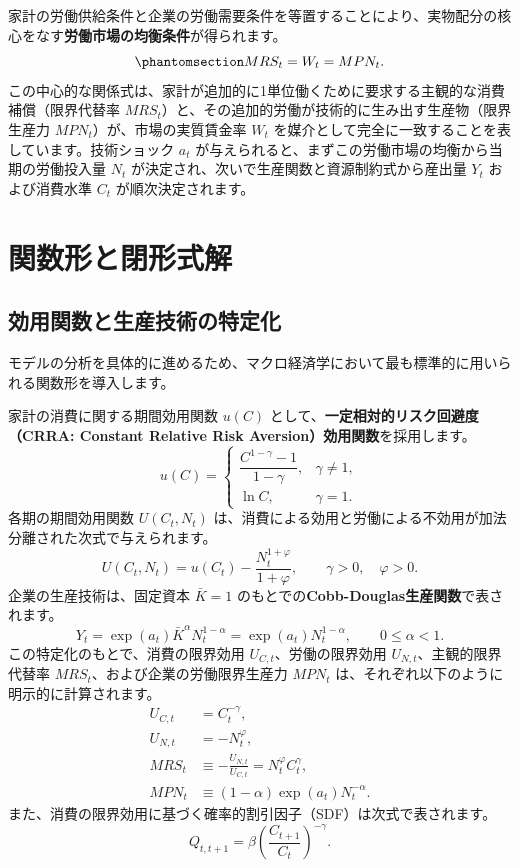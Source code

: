 \documentclass[
  japanese,
  lualatex,
  ja=standard,
  12pt,
  a4paper]{ltjsarticle}
\begin{document}
家計の労働供給条件と企業の労働需要条件を等置することにより、実物配分の核心をなす\textbf{労働市場の均衡条件}が得られます。
\begin{equation}\protect\phantomsection\label{eq-labor-market}{
MRS_t = W_t = MPN_t.
}\end{equation}
この中心的な関係式は、家計が追加的に1単位働くために要求する主観的な消費補償（限界代替率
\(MRS_t\)）と、その追加的労働が技術的に生み出す生産物（限界生産力
\(MPN_t\)）が、市場の実質賃金率 \(W_t\)
を媒介として完全に一致することを表しています。技術ショック \(a_t\)
が与えられると、まずこの労働市場の均衡から当期の労働投入量 \(N_t\)
が決定され、次いで生産関数と資源制約式から産出量 \(Y_t\) および消費水準
\(C_t\) が順次決定されます。

\section{関数形と閉形式解}\label{ux95a2ux6570ux5f62ux3068ux9589ux5f62ux5f0fux89e3}

\subsection{効用関数と生産技術の特定化}\label{ux52b9ux7528ux95a2ux6570ux3068ux751fux7523ux6280ux8853ux306eux7279ux5b9aux5316}

モデルの分析を具体的に進めるため、マクロ経済学において最も標準的に用いられる関数形を導入します。

家計の消費に関する期間効用関数 \(u(C)\)
として、\textbf{一定相対的リスク回避度（CRRA: Constant Relative Risk
Aversion）効用関数}を採用します。 \[
u(C) =
\begin{cases}
\dfrac{C^{1-\gamma}-1}{1-\gamma}, & \gamma \neq 1,\\[8pt]
\ln C, & \gamma = 1.
\end{cases}
\] 各期の期間効用関数 \(U(C_t, N_t)\)
は、消費による効用と労働による不効用が加法分離された次式で与えられます。
\[
U(C_t, N_t) = u(C_t) - \frac{N_t^{1+\varphi}}{1+\varphi}, \qquad \gamma > 0, \quad \varphi > 0.
\] 企業の生産技術は、固定資本 \(\bar{K}=1\)
のもとでの\textbf{Cobb-Douglas生産関数}で表されます。 \[
Y_t = \exp(a_t) \bar{K}^\alpha N_t^{1-\alpha} = \exp(a_t) N_t^{1-\alpha}, \qquad 0 \leq \alpha < 1.
\] この特定化のもとで、消費の限界効用 \(U_{C,t}\)、労働の限界効用
\(U_{N,t}\)、主観的限界代替率 \(MRS_t\)、および企業の労働限界生産力
\(MPN_t\) は、それぞれ以下のように明示的に計算されます。 \[
\begin{aligned}
U_{C,t} &= C_t^{-\gamma},\\
U_{N,t} &= -N_t^\varphi,\\
MRS_t &\equiv -\frac{U_{N,t}}{U_{C,t}} = N_t^\varphi C_t^\gamma,\\
MPN_t &\equiv (1-\alpha) \exp(a_t) N_t^{-\alpha}.
\end{aligned}
\] また、消費の限界効用に基づく確率的割引因子（SDF）は次式で表されます。
\[
Q_{t,t+1} = \beta \left( \frac{C_{t+1}}{C_t} \right)^{-\gamma}.
\]
\end{document}

